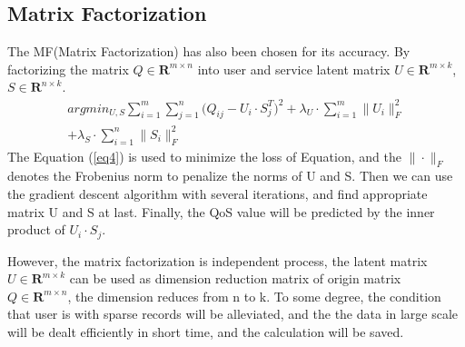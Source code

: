 \documentclass[conference]{IEEEtran}
\begin{document}
\subsection{Matrix Factorization}
The MF(Matrix Factorization) has also been chosen for its accuracy. By factorizing the matrix $Q\in \textbf{R}^{m \times n} $ into user and service latent matrix $U\in \textbf{R}^{m \times k}$, $S \in \textbf{R}^{n \times k}$. 
\begin{equation}
\begin{aligned}
argmin_{U,S} \sum_{i=1}^{m}{\sum_{j=1}^{n}{
(Q_{ij}-U_{i} \cdot S_{j}^{T}})^{2}
}
 + \lambda_{U} \cdot \sum_{i=1}^{m}\|U_{i}\|_{F}^{2} \\
+ \lambda_{S} \cdot \sum_{i=1}^{n}\|S_{i}\|_{F}^{2}
\label{eq4}
\end{aligned}
\end{equation}
The Equation (\ref{eq4}) is used to minimize the loss of Equation, and the $\| \cdot \|_{F}$ denotes the Frobenius norm\cite{chen_user_2016} to penalize the norms of U and S. Then we can use the gradient descent algorithm with several iterations, and find appropriate matrix U and S at last. Finally, the QoS value will be predicted by the inner product of $U_{i} \cdot S_{j}$. 
\par However, the matrix factorization is independent process, the latent matrix $U \in \textbf{R}^{m \times k}$ can be used as dimension reduction matrix of origin matrix $Q \in \textbf{R}^{m \times n}$, the dimension reduces from n to k. To some degree, the condition that user is with sparse records will be alleviated, and the the data in large scale will be dealt efficiently in short time, and the calculation will be saved.
\end{document}
